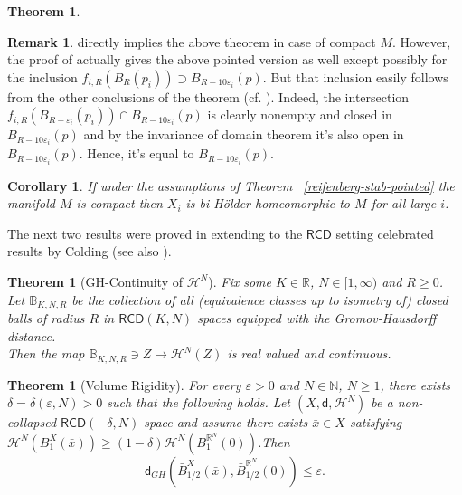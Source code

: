 \documentclass[a4paper]{amsart}
\newcounter{assu}
\theoremstyle{plain}
\newtheorem{theorem}[lemma]{Theorem}
\newtheorem{corollary}[lemma]{Corollary}
\theoremstyle{definition}
\newtheorem{remark}[lemma]{Remark}
\numberwithin{equation}{section}
\newcommand{\R}{\mathbb{R}}
\newcommand{\N}{\mathbb{N}}
\newcommand{\RCD}{\mathsf{RCD}}
\newcommand{\sfd}{\mathsf d}
\newcommand{\cH}{\mathcal{H}}
\newcommand{\eps}{\varepsilon}
\begin{document}
{\begin{theorem}
\end{theorem}
\begin{remark}\label{rem-onto}
 \cite[Theorem A.1.3]{CC97} directly implies the above theorem in case of compact $M$. However, the proof of  \cite[Theorem A.1.3]{CC97}  actually gives the above pointed version as well except possibly for the inclusion $f_{i,R}(B_R(p_i))\supset B_{R-10\eps_i}(p)$.
But that inclusion  easily follows from the other conclusions of the theorem (cf. \cite[Lemma 4.8]{Kap07}).
Indeed, the intersection $f_{i,R}(\bar B_{R-\eps_i}(p_i))\cap \bar B_{R-10 \eps_i}(p)$ is clearly nonempty and closed in  $\bar B_{R-10 \eps_i}(p)$ and by the invariance of domain theorem it's also open in  $\bar B_{R-10 \eps_i}(p)$. Hence, it's equal to $\bar B_{R-10 \eps_i}(p)$.
\end{remark}
\begin{corollary}\label{reifenberg-stab-compact}
If under the assumptions of Theorem ~\ref{reifenberg-stab-pointed}    the manifold $M$ is compact then   {$X_{i}$} is bi-H\"older homeomorphic to $M$ for all large $i$.
\end{corollary}
The next two results were proved in \cite{GDPNonColl} extending to the $\RCD$ setting  celebrated results by Colding \cite{Col97,coldingshape} (see also \cite{CC97}).
\begin{theorem}[GH-Continuity of $\cH^{N}$]\label{thm:ContHN}\cite[Theorem 1.3]{GDPNonColl} 
Fix some $K\in \R$, $N\in[1,\infty)$ and $R\geq0$. Let ${\mathbb B}_{K,N,R}$ be the collection of all (equivalence classes up to isometry of) closed balls of radius $R$
in $\RCD(K,N)$ spaces  equipped with the Gromov-Hausdorff distance.
\\Then the map ${\mathbb B}_{K,N,R}\ni Z \mapsto \cH^{N}(Z)$  is real valued and continuous.
\end{theorem}



\begin{theorem}[Volume Rigidity]\label{thm:VolRig}\cite[Theorem 1.6]{GDPNonColl}
For every $\varepsilon>0$ and $N\in \N$, $N\geq 1$, there exists $\delta=\delta(\varepsilon,N)>0$ such that the following holds. 
Let $(X,\sfd, \cH^{N})$ be a non-collapsed $\RCD(-\delta,N)$  space and assume there exists $\bar{x}\in X$ satisfying $\cH^{N}(B_{1}^{X}(\bar{x})) \geq (1-\delta) \cH^{N}(B_{1}^{\R^{N}}(0) )$.Then 
$$\sfd_{GH}(\bar{B}_{1/2}^{X}(\bar{x}), \bar{B}_{1/2}^{\R^{N}}(0))\leq \varepsilon.$$
\end{theorem}

}
\end{document}
